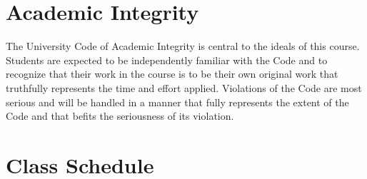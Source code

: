 \documentclass[a4paper]{modular_syllabus} %
\begin{document}
\vspace{0.5cm}
\section{Academic Integrity}

The University Code of Academic Integrity is central to the ideals of this course. Students are expected to be independently familiar with the Code and to recognize that their work in the course is to be their own original work that truthfully represents the time and effort applied.  Violations of the Code are most serious and will be handled in a manner that fully represents the extent of the Code and that befits the seriousness of its violation.\\

\newpage
\makeFullPage
\section{Class Schedule}
\end{document}
